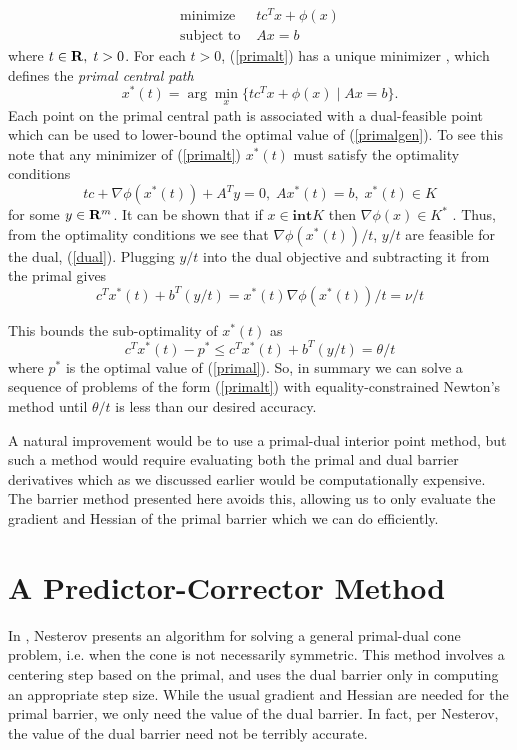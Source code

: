 \documentclass{article}
\begin{document}
\begin{equation}\label{primalt}
  \begin{array}{ll}
    \mbox{minimize}    & tc^Tx + \phi(x)\\
    \mbox{subject to } & Ax = b
  \end{array}
\end{equation}
where $t \in \mathbf{R},\;t >0$. For each $t >0$, (\ref{primalt}) has a unique minimizer \cite{BoV:04},
which defines the \emph{primal central path}
\[
  x^*(t) = \arg\min_x\{tc^Tx + \phi(x) \mid Ax=b\}.
\]
Each point on the primal central path is associated with a dual-feasible point which
can be used to lower-bound the optimal value of (\ref{primalgen}). To see this note that
any minimizer of (\ref{primalt}) $x^*(t)$ must satisfy the
optimality conditions
\[
  tc + \nabla\phi(x^*(t)) + A^Ty = 0 ,\; Ax^*(t) = b ,\; x^*(t) \in K
\]
for some $y\in\mathbf{R}^m$. It can be shown that if  $x \in \mathbf{int} K$ then
$\nabla\phi(x) \in K^*$ \cite{alkire2002convex}. Thus, from the optimality conditions we 
see that $\nabla\phi(x^*(t))/t$, $y/t$ are feasible for the dual, (\ref{dual}).
Plugging $y/t$ into the dual objective and subtracting it from the primal gives
\[
  c^Tx^*(t) + b^T(y/t) =  x^*(t)\nabla\phi(x^*(t))/t = \nu/t
\]

This bounds the sub-optimality of $x^*(t)$ as
\[
  c^Tx^*(t) - p^* \leq c^Tx^*(t) + b^T(y/t) = \theta/t 
\]
where $p^*$ is the optimal value of (\ref{primal}). So, in summary we can solve a sequence of 
problems of the form (\ref{primalt}) with equality-constrained Newton's
method until $\theta/t$ is less than our desired accuracy. 

A natural improvement would be to use a primal-dual interior point method,
but such a method would require evaluating both the primal and dual barrier derivatives
which as we discussed earlier would be computationally expensive. The barrier method
presented here avoids this, allowing us to only evaluate the gradient and Hessian of the
primal barrier which we can do efficiently.

\section{A Predictor-Corrector Method}
In \cite{nesterov2006towards}, Nesterov presents an algorithm for solving a general
primal-dual cone problem, i.e. when the cone is not necessarily symmetric. This
method involves a centering step based on the primal, and uses the dual barrier
only in computing an appropriate step size. While the usual gradient and
Hessian are needed for the primal barrier, we only need the value of the dual
barrier. In fact, per Nesterov, the value of the dual barrier need not be terribly accurate.
\end{document}
